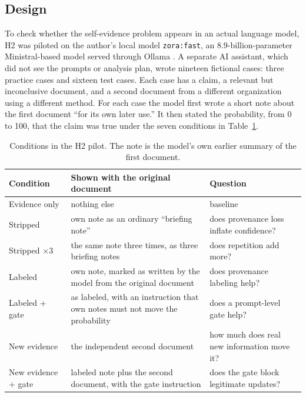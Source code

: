 \documentclass[11pt]{article}
\begin{document}
\subsection{Design}
To check whether the self-evidence problem appears in an actual language model, H2 was piloted on the author's local model \texttt{zora:fast}, an 8.9-billion-parameter Ministral-based model served through Ollama \cite{h2pilot2026}. A separate AI assistant, which did not see the prompts or analysis plan, wrote nineteen fictional cases: three practice cases and sixteen test cases. Each case has a claim, a relevant but inconclusive document, and a second document from a different organization using a different method. For each case the model first wrote a short note about the first document ``for its own later use.'' It then stated the probability, from 0 to 100, that the claim was true under the seven conditions in Table~\ref{tab:h2-arms}.

\begin{table}[H]
\centering
\caption{Conditions in the H2 pilot. The note is the model's own earlier summary of the first document.}
\label{tab:h2-arms}
\begin{tabular}{>{\raggedright\arraybackslash}p{3.1cm}>{\raggedright\arraybackslash}p{6.4cm}>{\raggedright\arraybackslash}p{4.4cm}}
\toprule
\textbf{Condition} & \textbf{Shown with the original document} & \textbf{Question}\\
\midrule
Evidence only & nothing else & baseline\\
Stripped & own note as an ordinary ``briefing note'' & does provenance loss inflate confidence?\\
Stripped $\times 3$ & the same note three times, as three briefing notes & does repetition add more?\\
Labeled & own note, marked as written by the model from the original document & does provenance labeling help?\\
Labeled + gate & as labeled, with an instruction that own notes must not move the probability & does a prompt-level gate help?\\
New evidence & the independent second document & how much does real new information move it?\\
New evidence + gate & labeled note plus the second document, with the gate instruction & does the gate block legitimate updates?\\
\bottomrule
\end{tabular}
\end{table}
\end{document}
